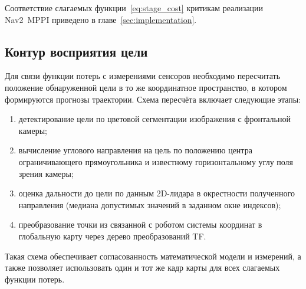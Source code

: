Соответствие слагаемых функции~\eqref{eq:stage_cost} критикам
реализации Nav2~MPPI приведено в главе~\ref{sec:implementation}.

\subsection{Контур восприятия цели}

Для связи функции потерь с измерениями сенсоров необходимо пересчитать
положение обнаруженной цели в то же координатное пространство, в котором
формируются прогнозы траектории. Схема пересчёта включает следующие
этапы:
\begin{enumerate}
    \item детектирование цели по цветовой сегментации изображения с
          фронтальной камеры;
    \item вычисление углового направления на цель по положению центра
          ограничивающего прямоугольника и известному горизонтальному
          углу поля зрения камеры;
    \item оценка дальности до цели по данным 2D-лидара в окрестности
          полученного направления (медиана допустимых значений в
          заданном окне индексов);
    \item преобразование точки из связанной с роботом системы координат
          в глобальную карту через дерево преобразований TF.
\end{enumerate}

Такая схема обеспечивает согласованность математической модели и
измерений, а также позволяет использовать один и тот же кадр карты
для всех слагаемых функции потерь.
